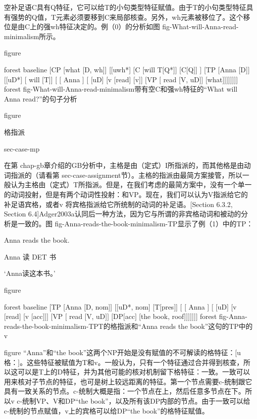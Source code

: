 空补足语C具有Q特征，它可以给T的小句类型特征赋值。由于T的小句类型特征具有强势的Q值，T元素必须要移到C来局部核查。另外，wh元素被移位了。这个移位是由C上的强wh特征决定的。例（0）的分析如图 fig-What-will-Anna-read-minimalism所示。





figure

forest
baseline
[CP
 [what [D, wh]]
 [[uwh*]
   [C
     [will T[Q*]]
     [C[Q]] ]
   [TP
   [Anna [D]]
   [[uD*]
     [ will  [T]]
     [
       [ Anna ]
       [ [uD]
         [v
           [read] [v]]
         [VP
           [ read  [V, uD]]
           [what]]]]]]]]
forest
fig-What-will-Anna-read-minimalism带有空C和强wh特征的“What will Anna read?”的句子分析


figure






格指派

sec-case-mp

在第 chap-gb章介绍的GB分析中，主格是由（定式）I所指派的，而其他格是由动词指派的（请看第 sec-case-assignment节）。主格的指派由最简方案接管，所以一般认为主格由（定式）T所指派。但是，在我们考虑的最简方案中，没有一个单一的动词投射，但是有两个动词性投射：和VP。现在，我们可以认为V指派给它的补足语宾格，或者v 将宾格指派给它所统制的动词的补足语。[Section 6.3.2, Section 6.4]Adger2003a认同后一种方法，因为它与所谓的非宾格动词和被动的分析是一致的。图 fig-Anna-reads-the-book-minimalism-TP显示了例（1）中的TP：









Anna reads the book.

Anna 读 DET 书

`Anna读这本书。'

figure

forest
baseline
[TP
 [Anna [D, nom]]
 [[uD*, nom]
   [T[pres]]
   [
     [ Anna ]
     [ [uD]
       [v
         [read] [v [acc]]]
       [VP
         [ read  [V, uD]]
         [DP[acc] [the book, roof]]]]]]]
forest
fig-Anna-reads-the-book-minimalism-TPT的格指派和“Anna reads the book”这句的TP中的v


figure
“Anna”和“the book”这两个NP开始是没有赋值的不可解读的格特征：[u格：]。这些特征被赋值为T和v。一般认为，只有一个特征通过合并得到核查，所以这可以是T上的D特征，并为其他可能的核对机制留下格特征：一致。一致可以用来核对子节点的特征，也可是树上较远距离的特征。第一个节点需要c-统制跟它具有一致关系的节点。c-统制大概是指：一个节点在上，然后任意多节点在下。所以v c-统制VP、V和DP“the book”，以及所有该DP内部的节点。由于一致可以给c-统制的节点赋值，v上的宾格可以给DP“the book”的格特征赋值。











